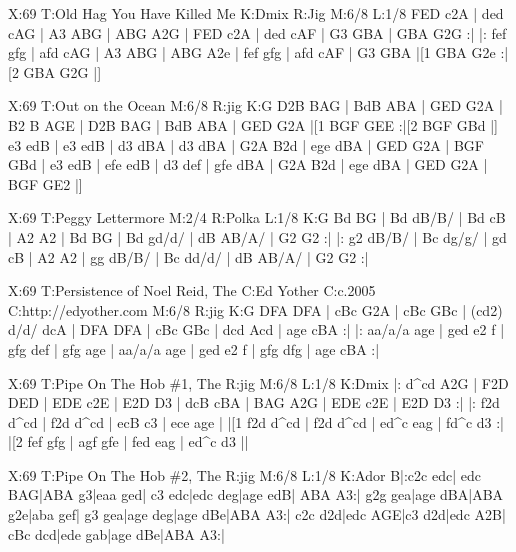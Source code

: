 \documentclass[letterpaper]{article}
\begin{document}
\begin{abc}[name]
X:69
T:Old Hag You Have Killed Me
K:Dmix
R:Jig
M:6/8
L:1/8
FED c2A | ded cAG | A3 ABG | ABG A2G |
FED c2A | ded cAF | G3 GBA | GBA G2G :|
|: fef gfg | afd cAG | A3 ABG | ABG A2e |
fef gfg | afd cAF | G3 GBA |[1 GBA G2e :|[2 GBA G2G |]
\end{abc}

\begin{abc}[name]
X:69
T:Out on the Ocean
M:6/8
R:jig
K:G
D2B BAG | BdB ABA | GED G2A | B2 B AGE |
D2B BAG | BdB ABA | GED G2A |[1 BGF GEE :|[2 BGF GBd |]
e3 edB | e3 edB | d3 dBA | d3 dBA |
G2A B2d | ege dBA | GED G2A | BGF GBd |
e3 edB | efe edB | d3 def | gfe dBA |
G2A B2d | ege dBA | GED G2A | BGF GE2 |]
\end{abc}

\begin{abc}[name]
X:69
T:Peggy Lettermore
M:2/4
R:Polka
L:1/8
K:G
Bd BG | Bd dB/B/ | Bd cB | A2 A2 |
Bd BG | Bd gd/d/ | dB AB/A/ | G2 G2 :|
|: g2 dB/B/ | Bc dg/g/ | gd cB | A2 A2 |
gg dB/B/ | Bc dd/d/ | dB AB/A/ | G2 G2 :|
\end{abc}

\begin{abc}[name]
X:69
T:Persistence of Noel Reid, The
C:Ed Yother
C:c.2005
C:http://edyother.com
M:6/8
R:jig
K:G
DFA DFA | cBc G2A | cBc GBc | ({c}d2) d/d/ dcA |
DFA DFA | cBc GBc | dcd Acd | age cBA :|
|: aa/a/a age | ged e2 f | gfg def | gfg age |
aa/a/a age | ged e2 f | gfg dfg | age cBA :|
\end{abc}

\begin{abc}[name]
X:69
T:Pipe On The Hob \#1, The
R:jig
M:6/8
L:1/8
K:Dmix
|: d^cd A2G | F2D DED | EDE c2E | E2D D3 |
dcB cBA | BAG A2G | EDE c2E | E2D D3 :|
|: f2d d^cd | f2d d^cd | ecB c3 | ece age |
|[1 f2d d^cd | f2d d^cd | ed^c eag | fd^c d3 :|
|[2 fef gfg | agf gfe | fed eag | ed^c d3 ||
\end{abc}

\begin{abc}[name]
X:69
T:Pipe On The Hob \#2, The
R:jig
M:6/8
L:1/8
K:Ador
B|:c2c edc| edc BAG|ABA g3|eaa ged|
c3 edc|edc deg|age edB| ABA A3:|
g2g gea|age dBA|ABA g2e|aba gef|
g3 gea|age deg|age dBe|ABA A3:|
c2c d2d|edc AGE|c3 d2d|edc A2B|
cBc dcd|ede gab|age dBe|ABA A3:|
\end{abc}
\end{document}
